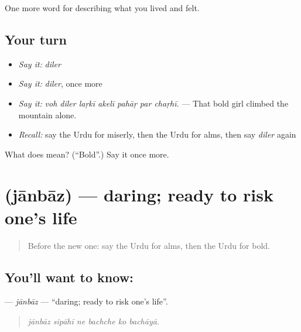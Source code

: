 \begin{grammarlens}[title={What you've built}]
One more word for describing what you lived and felt.
\end{grammarlens}

\subsection*{Your turn}
\begin{itemize}
\raggedright
  \item \emph{Say it:} \emph{diler}
  \item \emph{Say it:} \emph{diler}, once more
  \item \emph{Say it:} \emph{voh diler laṛkī akelī pahāṛ par chaṛhī.} — That bold girl climbed the mountain alone.
  \item \emph{Recall:} say the Urdu for miserly, then the Urdu for alms, then say \emph{diler} again
\end{itemize}

\begin{tcolorbox}[breakable,colback=teal!4,colframe=teal!35!black,title={Before you move on}]
What does  mean? (\textquotedblleft{}Bold\textquotedblright{}.) Say it once more.
\end{tcolorbox}
\section[\texorpdfstring{\ur{جانباز} (jānbāz)}{جانباز (jānbāz)}]{ (jānbāz) — daring; ready to risk one's life}

\label{lesson:UR-C460-janbaz}



\begin{quote}
Before the new one: say the Urdu for alms, then the Urdu for bold.
\end{quote}

\subsection*{You'll want to know: }
\textbf{} — \emph{jānbāz} — \textquotedblleft{}daring; ready to risk one's life\textquotedblright{}.

\begin{quote}
     
\end{quote}

\begin{quote}
\emph{jānbāz sipāhī ne bachche ko bachāyā.}
\end{quote}

